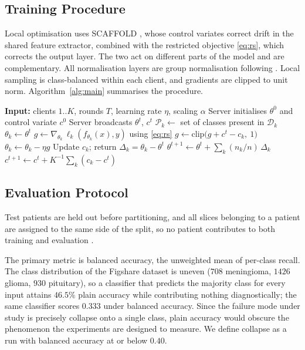 \documentclass[journal]{IEEEtran}
\begin{document}
\subsection{Training Procedure}
Local optimisation uses SCAFFOLD \cite{scaffold2020}, whose control variates
correct drift in the shared feature extractor, combined with the restricted
objective \eqref{eq:rs}, which corrects the output layer. The two act on
different parts of the model and are complementary. All normalisation layers are
group normalisation \cite{groupnorm2018} following \cite{hsieh2020}. Local
sampling is class-balanced within each client, and gradients are clipped to unit
norm. Algorithm~\ref{alg:main} summarises the procedure.

\begin{algorithm}[t]
\caption{Class-Presence-Guided Federated Training}
\label{alg:main}
\begin{algorithmic}[1]
\STATE \textbf{Input:} clients $1..K$, rounds $T$, learning rate $\eta$, scaling $\alpha$
\STATE Server initialises $\theta^{0}$ and control variate $c^{0}$
  \STATE Server broadcasts $\theta^{t}$, $c^{t}$
    \STATE $\mathcal{P}_k \leftarrow$ set of classes present in $\mathcal{D}_k$
    \STATE $\theta_k \leftarrow \theta^{t}$
      \STATE $g \leftarrow \nabla_{\theta_k}\, \ell_k(f_{\theta_k}(x), y)$ using \eqref{eq:rs}
      \STATE $g \leftarrow \mathrm{clip}\big(g + c^{t} - c_k,\ 1\big)$
      \STATE $\theta_k \leftarrow \theta_k - \eta g$
    \ENDFOR
    \STATE Update $c_k$; return $\Delta_k = \theta_k - \theta^{t}$
  \ENDFOR
  \STATE $\theta^{t+1} \leftarrow \theta^{t} + \sum_k (n_k/n)\,\Delta_k$
  \STATE $c^{t+1} \leftarrow c^{t} + K^{-1}\sum_k (c_k - c^{t})$
\ENDFOR
\end{algorithmic}
\end{algorithm}

\subsection{Evaluation Protocol}
\label{sec:protocol}
Test patients are held out before partitioning, and all slices belonging to a
patient are assigned to the same side of the split, so no patient contributes
to both training and evaluation \cite{yagis2021}.

The primary metric is balanced accuracy, the unweighted mean of per-class
recall. The class distribution of the Figshare dataset is uneven
($708$ meningioma, $1426$ glioma, $930$ pituitary), so a classifier that
predicts the majority class for every input attains $46.5\%$ plain accuracy
while contributing nothing diagnostically; the same classifier scores $0.333$
under balanced accuracy. Since the failure mode under study is precisely
collapse onto a single class, plain accuracy would obscure the phenomenon the
experiments are designed to measure. We define collapse as a run with balanced
accuracy at or below $0.40$.
\end{document}
